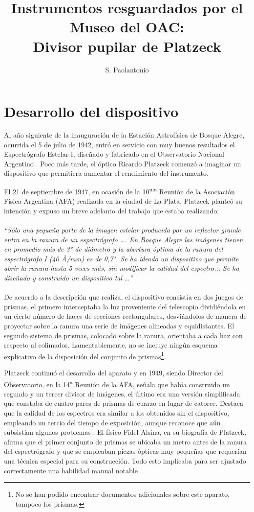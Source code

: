 \documentclass[baaa]{baaa}
\title{Instrumentos resguardados por el Museo del OAC: \\ Divisor pupilar de Platzeck}
\author{
S. Paolantonio\inst{1}
}
\institute{
Museo del Observatorio Astronómico de Córdoba, UNC, Argentina
}
\begin{document}
\maketitle
\section{Desarrollo del dispositivo}\label{S_intro}

Al año siguiente de la inauguración de la Estación Astrofísica de Bosque Alegre, ocurrida el 5 de julio de 1942, entró en servicio con muy buenos resultados el Espectrógrafo Estelar I, diseñado y fabricado en el Observatorio Nacional Argentino \citep{Paolantonio2023}. Poco más tarde, el óptico Ricardo Platzeck \citep{Paolantonio2016} comenzó a imaginar un dispositivo que permitiera aumentar el rendimiento del instrumento. 

El 21 de septiembre de 1947, en ocasión de la 10\textsuperscript{ma} Reunión de la Asociación Física Argentina (AFA) realizada en la ciudad de La Plata,  Platzeck planteó su intención y expuso un breve adelanto del trabajo que estaba realizando:
\\
\\
\textit{“Sólo una pequeña parte de la imagen estelar producida por un reflector grande entra en la ranura de un espectrógrafo …. En Bosque Alegre las imágenes tienen en promedio más de 3"  de diámetro y la abertura óptima de la ranura del espectrógrafo I (40 Å/mm) es de 0,7". Se ha ideado un dispositivo que permite abrir la ranura hasta 5 veces más, sin modificar la calidad del espectro... Se ha diseñado y construido un dispositivo tal …”} \citep{1948Platzeck}
\\
\\
De acuerdo a la descripción que realiza, el dispositivo consistía en dos juegos de prismas, el primero interceptaba la luz proveniente del telescopio dividiéndola en un cierto número de haces de secciones rectangulares, desviándolos de manera de proyectar sobre la ranura una serie de imágenes alineadas y equidistantes. El segundo sistema de prismas, colocado sobre la ranura, orientaba a cada haz con respecto al colimador. Lamentablemente, no se incluye ningún esquema explicativo de la disposición del conjunto de prismas\footnote{No se han podido encontrar documentos adicionales sobre este aparato, tampoco los prismas.}.

Platzeck continuó el desarrollo del aparato y en 1949, siendo Director del Observatorio, en la 14\textsuperscript{a} Reunión de la AFA, señala que había construido un segundo y un tercer divisor de imágenes, el último era una versión simplificada que constaba de cuatro pares de prismas de cuarzo en lugar de catorce. Destaca que la calidad de los espectros era similar a los obtenidos sin el dispositivo, empleando un tercio del tiempo de exposición, aunque reconoce que aún subsistían algunos problemas \citep{1951Platzeck_a}. El físico Fidel Alsina, en su biografía de Platzeck, afirma que el primer conjunto de prismas se ubicaba un metro antes de la ranura del espectrógrafo y que se empleaban piezas ópticas muy pequeñas que requerían una técnica especial para su construcción. Todo esto implicaba para ser ajustado correctamente una habilidad manual notable \citep{1983Alsina}.
\end{document}
